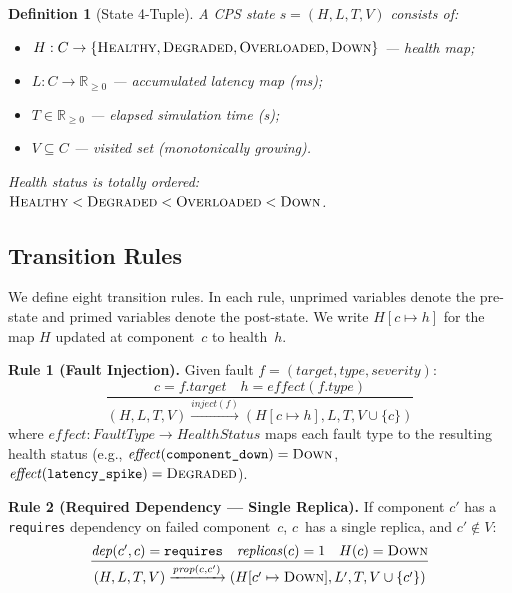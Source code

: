 \documentclass[10pt,twocolumn]{article}
\newtheorem{definition}{Definition}
\begin{document}
\begin{definition}[State 4-Tuple]\label{def:state}
A CPS state $s = (H, L, T, V)$ consists of:
\begin{itemize}[nosep]
\item $H: C \to \{\textsc{Healthy}, \textsc{Degraded}, \textsc{Overloaded}, \textsc{Down}\}$
  --- health map;
\item $L: C \to \mathbb{R}_{\ge 0}$ --- accumulated latency map (ms);
\item $T \in \mathbb{R}_{\ge 0}$ --- elapsed simulation time (s);
\item $V \subseteq C$ --- visited set (monotonically growing).
\end{itemize}
Health status is totally ordered:
$\textsc{Healthy} < \textsc{Degraded} < \textsc{Overloaded} < \textsc{Down}$.
\end{definition}

\subsection{Transition Rules}

We define eight transition rules.  In each rule, unprimed variables
denote the pre-state and primed variables denote the post-state.
We write $H[c \mapsto h]$ for the map $H$ updated at component~$c$
to health~$h$.

\medskip\noindent
\textbf{Rule 1 (Fault Injection).}
Given fault $f = (\mathit{target}, \mathit{type}, \mathit{severity})$:
\begin{equation}
  \frac{c = f.\mathit{target} \quad h = \mathit{effect}(f.\mathit{type})}
  {(H, L, T, V) \xrightarrow{\textit{inject}(f)}
   (H[c \mapsto h], L, T, V \cup \{c\})}
\end{equation}
where $\mathit{effect}: \mathit{FaultType} \to \mathit{HealthStatus}$ maps
each fault type to the resulting health status (e.g.,
$\mathit{effect}(\texttt{component\_down}) = \textsc{Down}$,
$\mathit{effect}(\texttt{latency\_spike}) = \textsc{Degraded}$).

\medskip\noindent
\textbf{Rule 2 (Required Dependency --- Single Replica).}
If component $c'$ has a \texttt{requires} dependency on failed component~$c$,
$c$~has a single replica, and $c' \notin V$:
\begin{equation}
  \frac{\mathit{dep}(c', c) = \texttt{requires} \quad
        \mathit{replicas}(c) = 1 \quad
        H(c) = \textsc{Down}}
  {(H, L, T, V) \xrightarrow{\textit{prop}(c, c')}
   (H[c' \mapsto \textsc{Down}], L', T, V \cup \{c'\})}
\end{equation}
\end{document}
